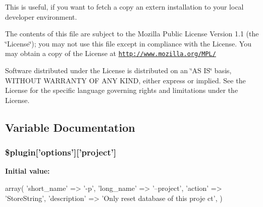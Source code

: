 This is useful, if you want to fetch a copy an extern installation to your local developer environment.

The contents of this file are subject to the Mozilla Public License Version 1.1 (the \char`\"{}License\char`\"{}); you may not use this file except in compliance with the License. You may obtain a copy of the License at \href{http://www.mozilla.org/MPL/}{\tt http://www.mozilla.org/MPL/}

Software distributed under the License is distributed on an \char`\"{}AS IS\char`\"{} basis, WITHOUT WARRANTY OF ANY KIND, either express or implied. See the License for the specific language governing rights and limitations under the License. 

\subsection{Variable Documentation}
\hypertarget{plugin__reset-db_8class_8php_ab3f61fdb66a7c26d551a861f8aee75c7}{
\subsubsection[{\$plugin}]{\setlength{\rightskip}{0pt plus 5cm}\$plugin\mbox{[}'options'\mbox{]}\mbox{[}'project'\mbox{]}}}
\label{plugin__reset-db_8class_8php_ab3f61fdb66a7c26d551a861f8aee75c7}
{\bfseries Initial value:}
\begin{DoxyCode}
 array(
                              'short_name'  => '-p',
                              'long_name'   => '--project',
                              'action'      => 'StoreString',
                              'description' => 'Only reset database of this proje
      ct',
                            )
\end{DoxyCode}
